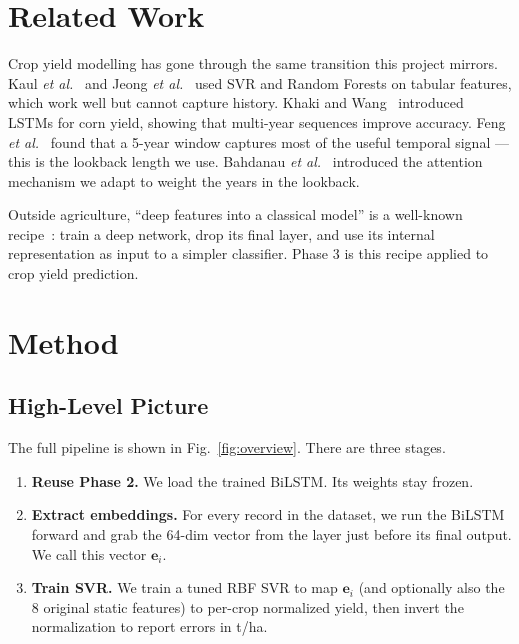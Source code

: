 \documentclass[conference]{IEEEtran}
\begin{document}
\section{Related Work}
\label{sec:lit}

Crop yield modelling has gone through the same transition this project mirrors. Kaul \emph{et al.}~\cite{kaul2005} and Jeong \emph{et al.}~\cite{jeong2016} used SVR and Random Forests on tabular features, which work well but cannot capture history. Khaki and Wang~\cite{khaki2019} introduced LSTMs for corn yield, showing that multi-year sequences improve accuracy. Feng \emph{et al.}~\cite{feng2019} found that a 5-year window captures most of the useful temporal signal — this is the lookback length we use. Bahdanau \emph{et al.}~\cite{bahdanau2015} introduced the attention mechanism we adapt to weight the years in the lookback.

Outside agriculture, ``deep features into a classical model'' is a well-known recipe~\cite{lecun2015}: train a deep network, drop its final layer, and use its internal representation as input to a simpler classifier. Phase 3 is this recipe applied to crop yield prediction.

\section{Method}
\label{sec:methodology}

\subsection{High-Level Picture}
The full pipeline is shown in Fig.~\ref{fig:overview}. There are three stages.
\begin{enumerate}
    \item \textbf{Reuse Phase 2.} We load the trained BiLSTM. Its weights stay frozen.
    \item \textbf{Extract embeddings.} For every record in the dataset, we run the BiLSTM forward and grab the 64-dim vector from the layer just before its final output. We call this vector $\mathbf{e}_i$.
    \item \textbf{Train SVR.} We train a tuned RBF SVR to map $\mathbf{e}_i$ (and optionally also the 8 original static features) to per-crop normalized yield, then invert the normalization to report errors in t/ha.
\end{enumerate}
\end{document}
